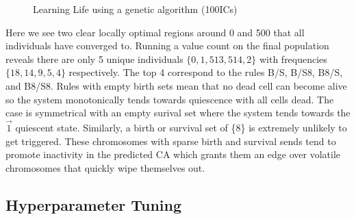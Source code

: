 \begin{figure}[!h]
\centering
            \hfill
            \hfill
            \caption{Learning Life using a genetic algorithm (100ICs)}
\label{fig:life-nothing}
\end{figure}

Here we see two clear locally optimal regions around 0 and 500 that all individuals have converged to. Running a value count on the final population reveals there are only 5 unique individuals $\{ 0, 1, 513, 514, 2 \}$ with frequencies $\{18, 14, 9, 5, 4 \}$ respectively. The top 4 correspond to the rules B/S, B/S8, B8/S, and B8/S8. Rules with empty birth sets mean that no dead cell can become alive so the system monotonically tends towards quiescence with all cells dead. The case is symmetrical with an empty surival set where the system tends towards the $\vec{1}$ quiescent state. Similarly, a birth or survival set of \{8\} is extremely unlikely to get triggered. These chromosomes with sparse birth and survival sends tend to promote inactivity in the predicted CA which grants them an edge over volatile chromosomes that quickly wipe themselves out.


\subsection{Hyperparameter Tuning}\label{sub:hyperparameter-tuning}

